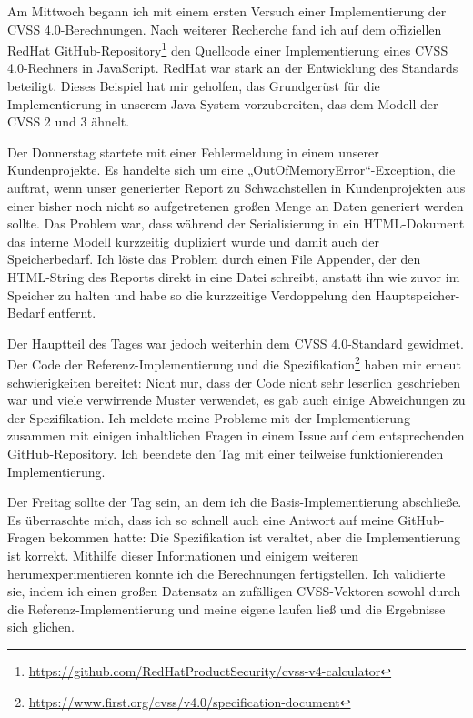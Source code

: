 Am Mittwoch begann ich mit einem ersten Versuch einer Implementierung der CVSS 4.0-Berechnungen.
Nach weiterer Recherche fand ich auf dem offiziellen RedHat GitHub-Repository\footnote{\url{https://github.com/RedHatProductSecurity/cvss-v4-calculator}} den Quellcode einer Implementierung eines CVSS 4.0-Rechners in JavaScript.
RedHat war stark an der Entwicklung des Standards beteiligt.
Dieses Beispiel hat mir geholfen, das Grundgerüst für die Implementierung in unserem Java-System vorzubereiten, das dem Modell der CVSS 2 und 3 ähnelt.

Der Donnerstag startete mit einer Fehlermeldung in einem unserer Kundenprojekte.
Es handelte sich um eine „OutOfMemoryError“-Exception, die auftrat, wenn unser generierter Report zu Schwachstellen in Kundenprojekten aus einer bisher noch nicht so aufgetretenen großen Menge an Daten generiert werden sollte.
Das Problem war, dass während der Serialisierung in ein HTML-Dokument das interne Modell kurzzeitig dupliziert wurde und damit auch der Speicherbedarf.
Ich löste das Problem durch einen File Appender, der den HTML-String des Reports direkt in eine Datei schreibt, anstatt ihn wie zuvor im Speicher zu halten und habe so die kurzzeitige Verdoppelung den Hauptspeicher-Bedarf entfernt.

Der Hauptteil des Tages war jedoch weiterhin dem CVSS 4.0-Standard gewidmet.
Der Code der Referenz-Implementierung und die Spezifikation\footnote{\url{https://www.first.org/cvss/v4.0/specification-document}} haben mir erneut schwierigkeiten bereitet:
Nicht nur, dass der Code nicht sehr leserlich geschrieben war und viele verwirrende Muster verwendet, es gab auch einige Abweichungen zu der Spezifikation.
Ich meldete meine Probleme mit der Implementierung zusammen mit einigen inhaltlichen Fragen in einem Issue auf dem entsprechenden GitHub-Repository.
Ich beendete den Tag mit einer teilweise funktionierenden Implementierung.

Der Freitag sollte der Tag sein, an dem ich die Basis-Implementierung abschließe.
Es überraschte mich, dass ich so schnell auch eine Antwort auf meine GitHub-Fragen bekommen hatte: Die Spezifikation ist veraltet, aber die Implementierung ist korrekt.
Mithilfe dieser Informationen und einigem weiteren herumexperimentieren konnte ich die Berechnungen fertigstellen.
Ich validierte sie, indem ich einen großen Datensatz an zufälligen CVSS-Vektoren sowohl durch die Referenz-Implementierung und meine eigene laufen ließ und die Ergebnisse sich glichen.

